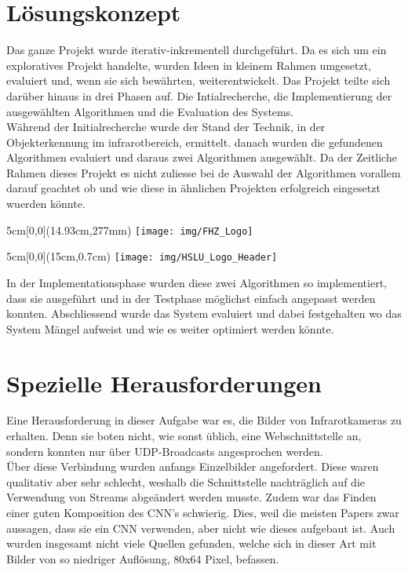 \documentclass[
	a4paper
]{scrartcl}
\begin{document}
\section{Lösungskonzept}
Das ganze Projekt wurde iterativ-inkrementell durchgeführt. Da es sich um ein exploratives Projekt handelte, wurden Ideen in kleinem Rahmen umgesetzt, evaluiert und, wenn sie sich bewährten, weiterentwickelt. Das Projekt teilte sich darüber hinaus in drei Phasen auf. Die Intialrecherche, die Implementierung der ausgewählten Algorithmen und die Evaluation des Systems.\\
Während der Initialrecherche wurde der Stand der Technik, in der Objekterkennung im infrarotbereich, ermittelt. danach wurden die gefundenen Algorithmen evaluiert und daraus zwei Algorithmen ausgewählt. Da der Zeitliche Rahmen dieses Projekt es nicht zuliesse bei de Auswahl der Algorithmen vorallem darauf geachtet ob und wie diese in ähnlichen Projekten erfolgreich eingesetzt wuerden könnte.

\begin{textblock*}{5cm}[0,0](14.93cm,277mm)
	\texttt{[image: img/FHZ\_Logo]}
\end{textblock*}

\newpage

\begin{textblock*}{5cm}[0,0](15cm,0.7cm)
	\texttt{[image: img/HSLU\_Logo\_Header]}
\end{textblock*}

In der Implementationsphase wurden diese zwei Algorithmen so implementiert, dass sie ausgeführt und in der Testphase möglichst einfach angepasst werden konnten. 
Abschliessend wurde das System evaluiert und dabei festgehalten wo das System Mängel aufweist und wie es weiter optimiert werden könnte.


\section{Spezielle Herausforderungen}
Eine Herausforderung in dieser Aufgabe war es, die Bilder von Infrarotkameras zu erhalten. Denn sie boten nicht, wie sonst üblich, eine Webschnittstelle an, sondern konnten nur über UDP-Broadcasts angesprochen werden.\\
Über diese Verbindung wurden anfangs Einzelbilder angefordert. Diese waren qualitativ aber sehr schlecht, weshalb die Schnittstelle nachträglich auf die Verwendung von Streams abgeändert werden musste.
Zudem war das Finden einer guten Komposition des CNN's schwierig. Dies, weil die meisten Papers zwar aussagen, dass sie ein CNN verwenden, aber nicht wie dieses aufgebaut ist. Auch wurden insgesamt nicht viele Quellen gefunden, welche sich in dieser Art mit Bilder von so niedriger Auflösung, 80x64 Pixel, befassen.
\end{document}
